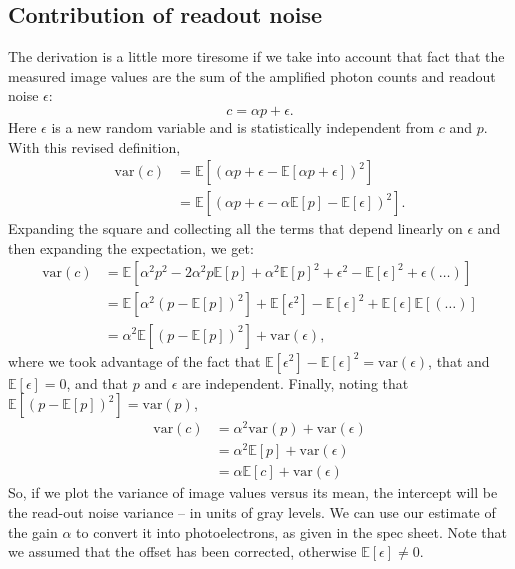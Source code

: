 \documentclass[a4paper]{report}
\begin{document}
\subsection{Contribution of readout noise}
The derivation is a little more tiresome if we take into account that fact that the measured image values are the sum of the amplified photon counts and readout noise $\epsilon$:
\begin{equation}
	c = \alpha p + \epsilon.
\end{equation}
Here $\epsilon$ is a new random variable and is statistically independent from $c$ and $p$. With this revised definition, 
\begin{align}
	\mathrm{var}(c) & = \mathbb{E}[(\alpha p + \epsilon - \mathbb{E}[\alpha p + \epsilon ])^2] \\
	& = \mathbb{E}[(\alpha p + \epsilon - \alpha \mathbb{E}[p] - \mathbb{E}[\epsilon])^2].
\end{align}
Expanding the square and collecting all the terms that depend linearly on $\epsilon$ and then expanding the expectation, we get:
\begin{align}
	\mathrm{var}(c) & = \mathbb{E}[\alpha^2 p^2 - 2\alpha^2 p\mathbb{E}[p] +\alpha^2\mathbb{E}[p]^2 + \epsilon^2 - \mathbb{E}[\epsilon]^2 + \epsilon(\ldots)]\\
	& =  \mathbb{E}[\alpha^2(p - \mathbb{E}[p])^2] + \mathbb{E}[\epsilon^2] - \mathbb{E}[\epsilon]^2 + \mathbb{E}[\epsilon]\mathbb{E}[(\ldots)] \\
	& = \alpha^2 \mathbb{E}[(p - \mathbb{E}[p])^2] + \mathrm{var}(\epsilon),
\end{align}
where we took advantage of the fact that $\mathbb{E}[\epsilon^2] - \mathbb{E}[\epsilon]^2 = \mathrm{var}(\epsilon)$, that and $\mathbb{E}[\epsilon]=0$, and that $p$ and $\epsilon$ are independent. Finally, noting that $\mathbb{E}[(p - \mathbb{E}[p])^2] = \mathrm{var}(p)$,
\begin{align}
	\mathrm{var}(c) & = \alpha^2 \mathrm{var}(p) + \mathrm{var}(\epsilon) \\
	& = \alpha^2 \mathbb{E}[p] + \mathrm{var}(\epsilon) \\
	& = \alpha\mathbb{E}[c] + \mathrm{var}(\epsilon)
\end{align}
So, if we plot the variance of image values versus its mean, the intercept will be the read-out noise variance -- in units of gray levels. We can use our estimate of the gain $\alpha$ to convert it into photoelectrons, as given in the spec sheet. Note that we assumed that the offset has been corrected, otherwise $\mathbb{E}[\epsilon] \neq 0$.
\end{document}
